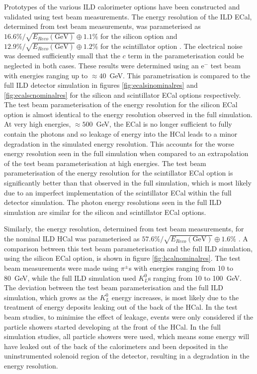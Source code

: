 Prototypes of the various ILD calorimeter options have been constructed and validated using test beam measurements.  The energy resolution of the ILD ECal, determined from test beam measurements, was parameterised as $16.6\% / \sqrt{E_{Reco}(\text{GeV})} \oplus 1.1 \%$ for the silicon option and $12.9 \% / \sqrt{E_{Reco}(\text{GeV})} \oplus 1.2 \%$ for the scintillator option \cite{Behnke:2013lya}.  The electrical noise was deemed sufficiently small that the $c$ term in the parameterisation could be neglected in both cases.  These results were determined using an $\text{e}^{-}$ test beam with energies ranging up to $\approx 40$~GeV.  This parametrisation is compared to the full ILD detector simulation in figures \ref{fig:ecalsinominalres} and \ref{fig:ecalscnominalres} for the silicon and scintillator ECal options respectively.  The test beam parameterisation of the energy resolution for the silicon ECal option is almost identical to the energy resolution observed in the full simulation.  At very high energies, $\approx 500$~GeV, the ECal is no longer sufficient to fully contain the photons and so leakage of energy into the HCal leads to a minor degradation in the simulated energy resolution.  This accounts for the worse energy resolution seen in the full simulation when compared to an extrapolation of the test beam parameterisation at high energies.  The test beam parameterisation of the energy resolution for the scintillator ECal option is significantly better than that observed in the full simulation, which is most likely due to an imperfect implementation of the scintillator ECal within the full detector simulation.  The photon energy resolutions seen in the full ILD simulation are similar for the silicon and scintillator ECal options.      

Similarly, the energy resolution, determined from test beam measurements, for the nominal ILD HCal was parameterised as $57.6 \% / \sqrt{E_{Reco}(\text{GeV})} \oplus 1.6 \%$ \cite{Adloff:2012gv}.  A comparison between this test beam parameterisation and the full ILD simulation, using the silicon ECal option, is shown in figure \ref{fig:hcalnominalres}.  The test beam measurements were made using $\pi^{\pm}$s with energies ranging from 10 to 80~GeV, while the full ILD simulation used $K^{0}_{L}$s ranging from 10 to 100~GeV.  The deviation between the test beam parameterisation and the full ILD simulation, which grows as the $K^{0}_{L}$ energy increases, is most likely due to the treatment of energy deposits leaking out of the back of the HCal.  In the test beam studies, to minimise the effect of leakage, events were only considered if the particle showers started developing at the front of the HCal.  In the full simulation studies, all particle showers were used, which means some energy will have leaked out of the back of the calorimeters and been deposited in the uninstrumented solenoid region of the detector, resulting in a degradation in the energy resolution.   

